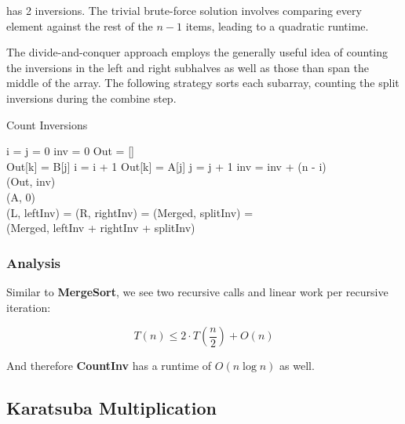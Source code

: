 \documentclass{standalone}
\begin{document}
has 2 inversions. The trivial brute-force solution involves comparing every element against the rest of the $n-1$ items, leading to a quadratic runtime.

The divide-and-conquer approach employs the generally useful idea of counting the inversions in the left and right subhalves as well as those than span the middle of the array. The following strategy sorts each subarray, counting the split inversions during the combine step.

\begin{algorithm}
\caption{Count Inversions}
  \begin{algorithmic}
      \State i = j = 0
      \State inv = 0
      \State Out = [] \\
          \State Out[k] = B[j]
          \State i = i + 1
        \Else
          \State Out[k] = A[j]
          \State j = j + 1
          \State inv = inv + (n - i) \\
        \EndIf
      \EndFor
      \Return (Out, inv) \\
    \EndProcedure
        \Return (A, 0) \\
      \EndIf
      \State (L, leftInv) = 
      \State (R, rightInv) = 
      \State (Merged, splitInv) =  \\
      \Return (Merged, leftInv + rightInv + splitInv)
    \EndProcedure
  \end{algorithmic}
\end{algorithm}

\subsubsection{Analysis}

Similar to \textbf{MergeSort}, we see two recursive calls and linear work per recursive iteration:

\[
  T(n) \leqslant 2 \cdot T(\frac n 2) + O(n)
\]

And therefore \textbf{CountInv} has a runtime of $O(n \log n)$ as well.

\subsection{Karatsuba Multiplication}
\end{document}
